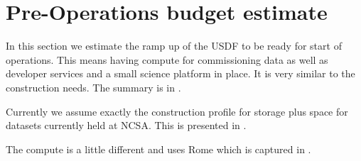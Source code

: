 \section{Pre-Operations budget estimate}\label{sec:preopscost}
In this section we estimate the ramp up of the USDF to be ready for start of operations.
This means having compute for commissioning data as well as developer services and a small science platform in place.
It is very similar to the construction needs. The summary is in .



Currently we assume exactly the construction profile for storage plus space for datasets currently held at NCSA.
This is presented in .

The compute is a little different and uses Rome
which is captured in .




